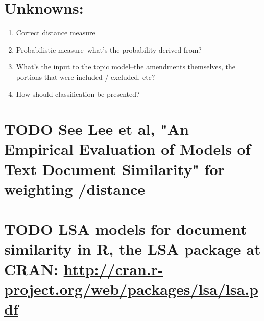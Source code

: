 \documentclass[11pt]{article}
\begin{document}
\section{Unknowns:}
\label{sec-2}

\begin{enumerate}
\item Correct distance measure
\item Probabilistic measure--what's the probability derived from?
\item What's the input to the topic model--the amendments themselves,
     the portions that were included / excluded, etc?
\item How should classification be presented?
\end{enumerate}
\section{\textbf{TODO} See Lee et al, "An Empirical Evaluation of Models of Text Document Similarity" for weighting /distance}
\label{sec-3}
\section{\textbf{TODO} LSA models for document similarity in R, the LSA package at CRAN: \href{http://cran.r-project.org/web/packages/lsa/lsa.pdf}{http://cran.r-project.org/web/packages/lsa/lsa.pdf}}
\label{sec-4}
\end{document}
